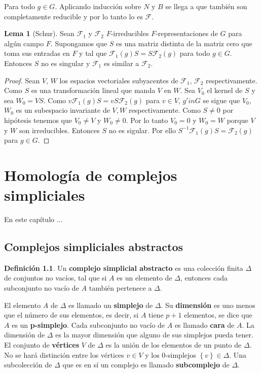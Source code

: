 \documentclass[12pt]{book}
\theoremstyle{definition}
\newtheorem{definition}[theorem]{Definición}
\newtheorem{lemma}[theorem]{Lema}
\newcounter{in}
\newcounter{ini}
\begin{document}
Para todo $g \in G$. Aplicando inducción sobre $N$ y $B$ se llega a
que también son completamente reducible y por lo tanto lo es
$\mathcal{F}$.
\begin{lemma}[Schur]
  \label{shf}
  Sean $\mathcal{F}_{1}$ y $\mathcal{F}_{2}$ $F$-irreducibles
  $F$-representaciones de $G$ para algún campo $F$. Supongamos que $S$
  es una matriz distinta de la matriz cero que toma sus entradas en
  $F$ y tal que $\mathcal{F}_{1}(g)S=S\mathcal{F}_{2}(g)$ para todo
  $g \in G$. Entonces $S$ no es singular y $\mathcal{F}_{1}$ es
  similar a $\mathcal{F}_{2}$.
\end{lemma}
\begin{proof}
  Sean $V$, $W$ los espacios vectoriales subyacentes de
  $\mathcal{F}_{1}$, $\mathcal{F}_{2}$ respectivamente. Como $S$ es
  una transformación lineal que manda $V$ en $W$. Sea $V_{0}$ el
  kernel de $S$ y sea $W_{0} =VS$. Como
  $v\mathcal{F}_{1}(g)S=vS\mathcal{F}_{2}(g)$ para $v \in V$,
  $g 'in G$ se sigue que $V_{0}$, $W_{0}$ es un subespacio invariante
  de $V,W$ respectivamente. Como $S \neq 0$ por hipótesis tenemos que
  $V_{0} \neq V$ y $W_{0} \neq 0$. Por lo tanto $V_{0}=0$ y $W_{0}=W$
  porque $V$ y $W$ son irreducibles. Entonces $S$ no es sigular. Por
  ello $S^{-1}\mathcal{F}_{1}(g)S=\mathcal{F}_{2}(g)$ para $g \in G$.
\end{proof}

\chapter{Homología de complejos simpliciales}
\label{hsc}
En este capítulo ...

\section{Complejos simpliciales abstractos}
\label{asc}

\begin{definition}
  \label{dasc}
  Un \textbf{complejo simplicial abstracto} es una colección
  finita $\Delta$ de conjuntos no vacíos, tal que si $A$ es un
  elemento de $\Delta$, entonces cada subconjunto no vacío de $A$
  también pertenece a $\Delta$.
\end{definition}

El elemento $A$ de $\Delta$ es llamado un \textbf{simplejo}
de $\Delta$. Su \textbf{dimensión} es uno menos que el número
de sus elementos, es decir, si $A$ tiene $p+1$ elementos, se dice que
$A$ es un \textbf{p-simplejo}. Cada subconjunto no vacío de
$A$ es llamado \textbf{cara} de $A$.  La dimensión de $\Delta$
  es la mayor dimensión que alguno de sus simplejos pueda tener. El
  conjunto de \textbf{vértices} $V$ de $\Delta$ es la unión
  de los elementos de un punto de $\Delta$. No se hará distinción
  entre los vértices $v \in V$ y los $0$-simplejos
  $\left\{ v \right\} \in \Delta$. Una subcolección de $\Delta$ que es
  en sí un complejo es llamado \textbf{subcomplejo} de
    $\Delta$.
\end{document}
